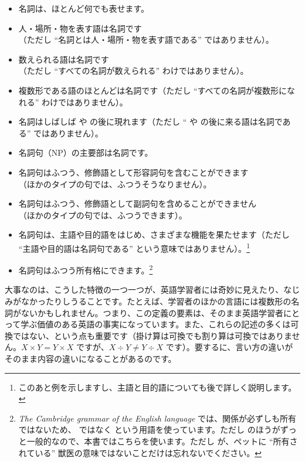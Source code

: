\begin{itemize}[noitemsep]
    \item 名詞は、ほとんど何でも表せます。
    \item 人・場所・物を表す語は名詞です \\（ただし \enquote{名詞とは人・場所・物を表す語である} ではありません）。
    \item 数えられる語は名詞です \\（ただし \enquote{すべての名詞が数えられる} わけではありません）。
    \item 複数形である語のほとんどは名詞です（ただし \enquote{すべての名詞が複数形になれる} わけではありません）。
    \item 名詞はしばしば  や  の後に現れます（ただし \enquote{ や  の後に来る語は名詞である} ではありません）。
    \item 名詞句（NP）の主要部は名詞です。
    \item 名詞句はふつう、修飾語として形容詞句を含むことができます \\（ほかのタイプの句では、ふつうそうなりません）。
    \item 名詞句はふつう、修飾語として副詞句を含めることができません \\（ほかのタイプの句では、ふつうできます）。
    \item {}名詞句は、主語や目的語をはじめ、さまざまな機能を果たせます（ただし \enquote{主語や目的語は名詞句である} という意味ではありません）。\footnote{このあと例を示しますし、主語と目的語についても後で詳しく説明します。}
    \item {}名詞句はふつう所有格にできます。\footnote{\textit{The Cambridge grammar of the English language} では、関係が必ずしも所有ではないため、 ではなく  という用語を使っています。ただし  のほうがずっと一般的なので、本書ではこちらを使います。ただし  が、ペットに \enquote{所有されている} 獣医の意味ではないことだけは忘れないでください。}
\end{itemize}

大事なのは、こうした特徴の一つ一つが、英語学習者には奇妙に見えたり、なじみがなかったりしうることです。たとえば、学習者のほかの言語には複数形の名詞がないかもしれません。つまり、この定義の要素は、そのまま英語学習者にとって学ぶ価値のある英語の事実になっています。また、これらの記述の多くは可換ではない、という点も重要です（掛け算は可換でも割り算は可換ではありません。$X \times Y = Y \times X$ ですが、$X \div Y \neq Y \div X$ です）。要するに、言い方の違いがそのまま内容の違いになることがあるのです。

